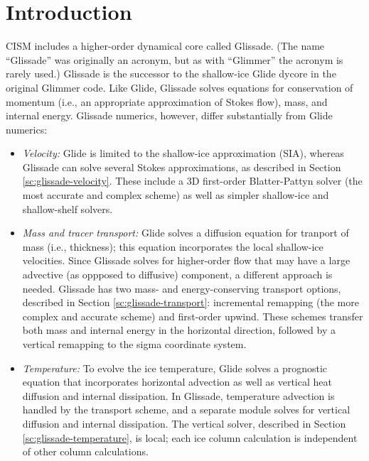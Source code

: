 

\section{Introduction}
\label{sc:glissade-intro}

CISM includes a higher-order dynamical core called Glissade.  (The name ``Glissade'' was originally an acronym,
but as with ``Glimmer'' the acronym is rarely used.) Glissade is the successor to the shallow-ice
Glide dycore in the original Glimmer code.  Like Glide, Glissade solves equations for conservation of momentum
(i.e., an appropriate approximation of Stokes flow), mass, and internal energy. Glissade numerics, however,
differ substantially from Glide numerics:

\begin{itemize}

\item \textit{Velocity:}
Glide is limited to the shallow-ice approximation (SIA), whereas Glissade can solve several Stokes
approximations, as described in Section \ref{sc:glissade-velocity}.
These include a 3D first-order Blatter-Pattyn solver (the most accurate and complex scheme)
as well as simpler shallow-ice and shallow-shelf solvers.

\item \textit{Mass and tracer transport:}
Glide solves a diffusion equation for tranport of mass (i.e., thickness); this equation incorporates the local shallow-ice
velocities. Since Glissade solves for higher-order flow that may have a large advective (as oppposed to diffusive)
component, a different approach is needed.  Glissade has two mass- and energy-conserving transport options, 
described in Section \ref{sc:glissade-transport}:
incremental remapping (the more complex and accurate scheme) and first-order upwind. These schemes
transfer both mass and internal energy in the horizontal direction, followed by a vertical remapping to
the sigma coordinate system.

\item \textit{Temperature:}
To evolve the ice temperature, Glide solves a prognostic equation that incorporates horizontal advection as well
as vertical heat diffusion and internal dissipation.  In Glissade, temperature advection is handled by the
transport scheme, and a separate module solves for vertical diffusion and internal dissipation.
The vertical solver, described in Section \ref{sc:glissade-temperature}, is local; 
each ice column calculation is independent of other column calculations.
\end{itemize}

